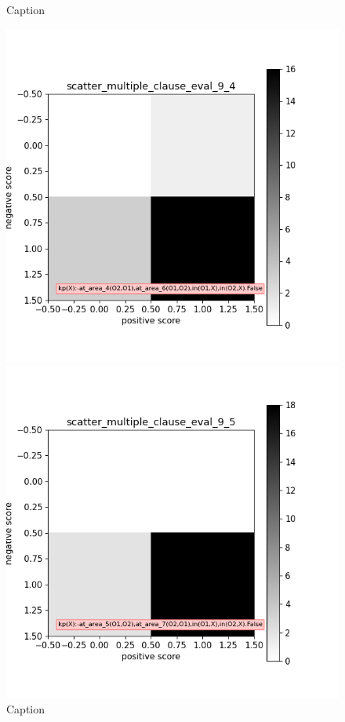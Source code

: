 \documentclass[
]{ceurart}
\begin{document}
\begin{figure}[h]
\begin{minipage}[b]{.3\textwidth}
		\caption{Caption}\label{label-d}
	\end{minipage}
	\begin{minipage}[b]{.3\textwidth}
		\includegraphics[width=\textwidth]{img/mce/mce-4.png}
		\caption{Caption}\label{label-e}
	\end{minipage}
	\begin{minipage}[b]{.3\textwidth}
		\includegraphics[width=\textwidth]{img/mce/mce-5.png}

\end{minipage}
\end{figure}
\end{document}
